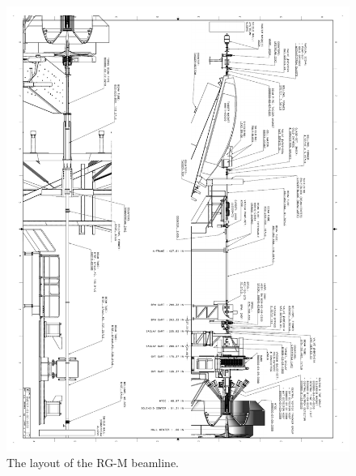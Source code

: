 \documentclass[12pt]{article}
\begin{document}
\begin{figure}[hbt]
\vspace{-2cm}
\begin{center}
\includegraphics[width=6in]{rgm_beam_page2.pdf}
\end{center}
\caption{ \label{fig:beamline2} 
The layout of the RG-M beamline. }
\end{figure}
\end{document}
